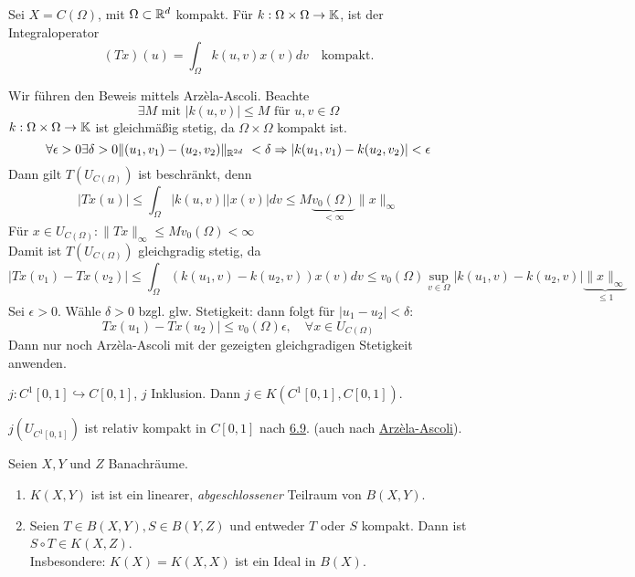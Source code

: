 \begin{beispiel} \label{bsp:7.3}
	Sei $X = C(\Omega)$, mit $\Omega \subset \mathbb{R}^{d}$ kompakt. Für $k : \Omega \times \Omega \rightarrow \mathbb{K}$, ist der Integraloperator
	\[ (Tx)(u) = \int_{\Omega} k(u, v) x(v) dv \quad \text{kompakt.} \]
	\begin{beweis}
		Wir führen den Beweis mittels Arzèla-Ascoli. Beachte
		\[ \exists M \text{ mit } |k(u, v)| \leq M \text{ für } u, v \in \Omega \]
		$k : \Omega \times \Omega \rightarrow \mathbb{K}$ ist gleichmä{\ss}ig stetig, da $\Omega \times \Omega$ kompakt ist.
		\[ \forall \epsilon > 0 \exists \delta > 0 \| (u_1, v_1) - (u_2, v_2) \|_{\MdR^{2d}} < \delta \Rightarrow |k(u_1, v_1) - k(u_2, v_2)| < \epsilon \]
		Dann gilt $T(U_{C(\Omega)})$ ist beschränkt, denn
		\[ |Tx(u)| \leq \int_{\Omega} |k(u, v)| |x(v)| dv \leq M \underbrace{v_{0}(\Omega)}_{< \infty} \| x \|_{\infty} \]
		Für $x \in U_{C(\Omega)}: \| Tx \|_{\infty} \leq M v_{0}(\Omega) < \infty$ \\
		Damit ist $T(U_{C(\Omega)})$ gleichgradig stetig, da
		\[ |Tx(v_1) - Tx(v_2)| \leq \int_{\Omega} \left( k(u_1, v) - k(u_2, v) \right) x(v) dv \leq v_{0}(\Omega) \sup_{v \in \Omega} | k(u_1, v) - k(u_2, v) | \underbrace{\| x \|_{\infty}}_{ \leq 1 } \]
		Sei $\epsilon > 0$. Wähle $\delta > 0$ bzgl. glw. Stetigkeit: dann folgt für 	$|u_1 - u_2| < \delta$:
		\[ Tx(u_1) - Tx(u_2) | \leq v_{0}(\Omega) \epsilon, \quad \forall x \in U_{C(\Omega)} \]
		Dann nur noch Arzèla-Ascoli mit der gezeigten gleichgradigen Stetigkeit anwenden.
	\end{beweis}
\end{beispiel}

\begin{beispiel} \label{bsp:7.4}
	$j : C^{1}[0, 1] \hookrightarrow C[0, 1]$, $j$ Inklusion. Dann $j \in K(C^{1}[0, 1], C[0, 1])$.
	\begin{beweis}
		$j(U_{C^{1}[0, 1]})$ ist relativ kompakt in $C[0, 1]$ nach \hyperref[]{6.9}. (auch nach \hyperref[satz-6.7-arzelaascoli]{Arzèla-Ascoli}).
	\end{beweis}
\end{beispiel}

\begin{satz} \label{satz:7-5}
	Seien $X, Y$ und $Z$ Banachräume.
	\begin{enumerate}[label=\alph*\upshape)]
		\label{satz:7-5a}
		\item $K(X, Y)$ ist ist ein linearer, \textit{abgeschlossener} Teilraum von $B(X, Y)$.
		\item Seien $T \in B(X, Y), S \in B(Y, Z)$ und entweder $T$ oder $S$ kompakt. Dann ist $S \circ T \in K(X, Z)$. \\
			Insbesondere: $K(X) = K(X, X)$ ist ein Ideal in $B(X)$.
	\end{enumerate}
\end{satz}

